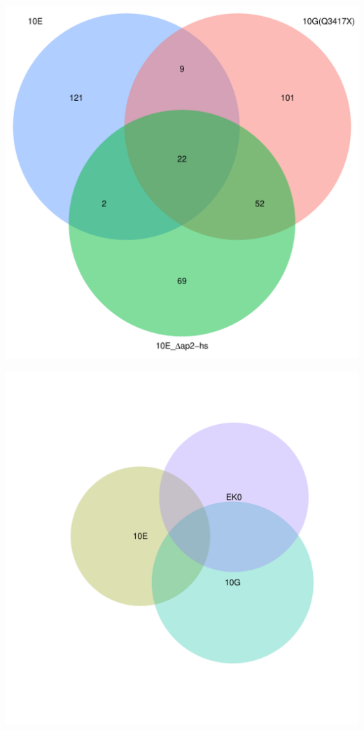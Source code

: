\documentclass{article}\usepackage[]{graphicx}\usepackage[]{color}
\newenvironment{knitrout}{}{} %
\begin{document}
\begin{knitrout}
\color{fgcolor}

{\centering \includegraphics[width=1\linewidth,height=.4\textheight]{figure/minimal-venn_t2_3fc_down_venn-1} 

}



\end{knitrout}
\begin{knitrout}
\color{fgcolor}

{\centering \includegraphics[width=1\linewidth,height=.4\textheight]{figure/minimal-venn_t2_3fc_down_euler-1} 

}



\end{knitrout}
\clearpage
\end{document}
